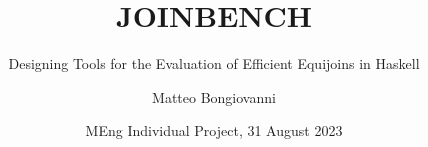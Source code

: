 \documentclass{beamer}
\title{JOINBENCH}
\subtitle{Designing Tools for the Evaluation of Efficient Equijoins in Haskell}
\author{Matteo Bongiovanni}
\date{MEng Individual Project, 31 August 2023}
\institute{Joint Mathematics and Computing \\ Department of Computing}
\begin{document}
\frame{\titlepage}
\end{document}
